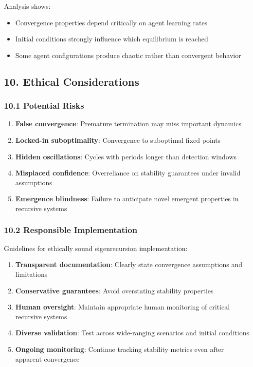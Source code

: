 \documentclass[
]{article}
\providecommand{\tightlist}{%
  \setlength{\itemsep}{0pt}\setlength{\parskip}{0pt}}
\begin{document}
Analysis shows:

\begin{itemize}
\tightlist
\item
  Convergence properties depend critically on agent learning rates
\item
  Initial conditions strongly influence which equilibrium is reached
\item
  Some agent configurations produce chaotic rather than convergent
  behavior
\end{itemize}

\subsection{10. Ethical Considerations}\label{ethical-considerations}

\subsubsection{10.1 Potential Risks}\label{potential-risks}

\begin{enumerate}
\def\labelenumi{\arabic{enumi}.}
\tightlist
\item
  \textbf{False convergence}: Premature termination may miss important
  dynamics
\item
  \textbf{Locked-in suboptimality}: Convergence to suboptimal fixed
  points
\item
  \textbf{Hidden oscillations}: Cycles with periods longer than
  detection windows
\item
  \textbf{Misplaced confidence}: Overreliance on stability guarantees
  under invalid assumptions
\item
  \textbf{Emergence blindness}: Failure to anticipate novel emergent
  properties in recursive systems
\end{enumerate}

\subsubsection{10.2 Responsible
Implementation}\label{responsible-implementation}

Guidelines for ethically sound eigenrecursion implementation:

\begin{enumerate}
\def\labelenumi{\arabic{enumi}.}
\tightlist
\item
  \textbf{Transparent documentation}: Clearly state convergence
  assumptions and limitations
\item
  \textbf{Conservative guarantees}: Avoid overstating stability
  properties
\item
  \textbf{Human oversight}: Maintain appropriate human monitoring of
  critical recursive systems
\item
  \textbf{Diverse validation}: Test across wide-ranging scenarios and
  initial conditions
\item
  \textbf{Ongoing monitoring}: Continue tracking stability metrics even
  after apparent convergence
\end{enumerate}
\end{document}

